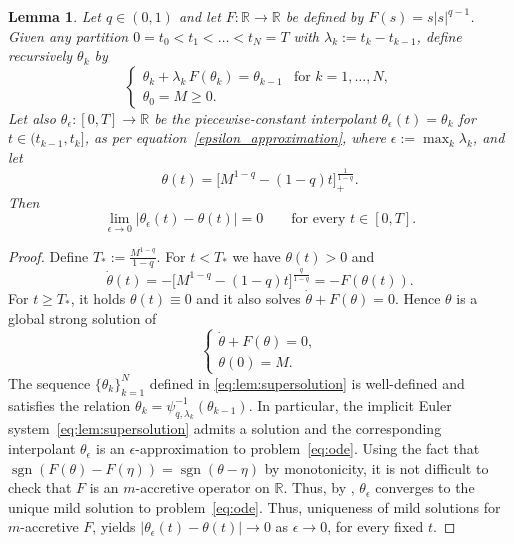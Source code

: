 \documentclass[journal]{article}
\theoremstyle{nonitalic}
\theoremstyle{nonitalic}
\theoremstyle{plain} %
\newtheorem{lemma}[theorem]{Lemma}
\numberwithin{equation}{section}
\newcommand{\R}{\mathbb{R}}
\begin{document}
\begin{lemma}\label{lem:supersolution}
    Let $q\in(0,1)$ and let $F: \R \to\R$ be defined  by $F(s)= s |s|^{q-1}$.
Given  any partition $0=t_0<t_1<\ldots<t_N= T$ with $\lambda_k:=t_k-t_{k-1}$, define recursively $\theta_k$ by 
\begin{equation}\label{eq:lem:supersolution}
\begin{cases}
\theta_k+\lambda_k\,F(\theta_k)=\theta_{k-1} &\mbox{for } k=1,\ldots, N,\\
 \theta_0=M\geq 0.
\end{cases}
\end{equation}
Let  also $\theta_\epsilon:[0,T]\to\R$ be the piecewise-constant interpolant  $\theta_\epsilon(t)=\theta_k$ for $t\in(t_{k-1},t_k]$, as per equation~\eqref{epsilon_approximation}, where $\epsilon:=\max_k\lambda_k$, and let
\[
\theta(t)=\bigl[M^{1-q}-(1-q)t\bigr]_+^{\frac1{1-q}}.
\]
Then 
$$
\lim_{\epsilon \to 0}|\theta_\epsilon(t) - \theta (t)|=0 \qquad \mbox{for every } t\in [0, T].
$$
\end{lemma}
\begin{proof}

Define $T_\ast:=\frac{M^{1-q}}{1-q}$.
For $t<T_\ast$ we have $\theta(t)>0$ and
\[
\dot \theta(t)= -\bigl[M^{1-q}-(1-q)t\bigr]^{\frac{q}{1-q}}
=-F(\theta(t)).
\]
For $t\ge T_\ast$, it holds $\theta(t)\equiv 0$ and it also solves $\dot \theta+ F(\theta)=0$. Hence $\theta$ is a global strong solution of
\begin{equation}
\label{eq:ode}
\begin{cases}
\dot \theta + F(\theta)=0, \\
\theta(0) = M.
\end{cases}
\end{equation}
The sequence $\{\theta_k\}_{k=1}^N$ defined in \eqref{eq:lem:supersolution} is well-defined and satisfies the relation $\theta_k = \psi_{q,\lambda_k}^{-1}(\theta_{k-1})$. In particular, the implicit Euler system~\eqref{eq:lem:supersolution} admits a solution and the corresponding interpolant $\theta_\epsilon$ is an $\epsilon$-approximation to problem~\eqref{eq:ode}. 
Using the fact that $\operatorname{sgn}(F(\theta) - F(\eta)) =  \operatorname{sgn}(\theta - \eta)$ by monotonicity, %
it is not difficult to check that $F$ is an $m$-accretive operator on $\mathbb{R}$. Thus, by \cite[Theorem 4.1]{barbu2010nonlinear}, $\theta_\epsilon$ converges to the unique mild solution to problem~\eqref{eq:ode}.   Thus,  uniqueness of mild solutions for $m$-accretive $F$, yields $| \theta_\epsilon (t) - \theta(t)| \to 0$ as $\epsilon \to 0$, for every fixed $t$.
\end{proof}
\end{document}
